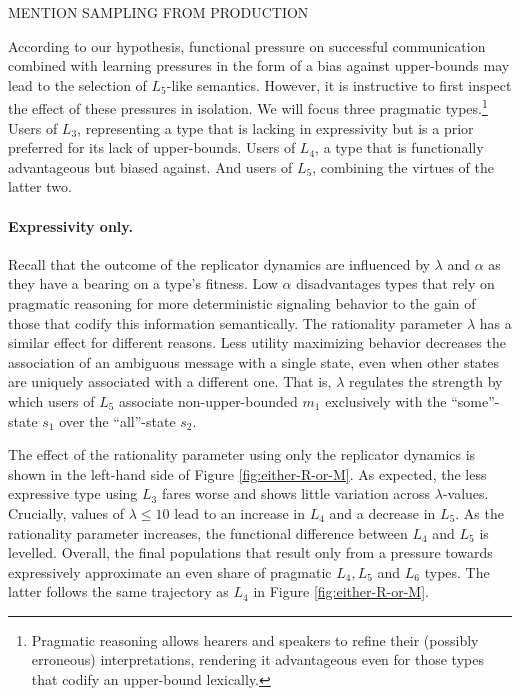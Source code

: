 \documentclass[a4paper]{article}
\newcommand{\hl}[1]{\textcolor[rgb]{.8,.33,.0}{#1}}%
\begin{document}
\hl{MENTION SAMPLING FROM PRODUCTION}

According to our hypothesis, functional pressure on successful communication combined with learning pressures in the form of a bias against upper-bounds may lead to the selection of $L_5$-like semantics. However, it is instructive to first inspect the effect of these pressures in isolation. We will focus three pragmatic types.\footnote{Pragmatic reasoning allows hearers and speakers to refine their (possibly erroneous) interpretations, rendering it advantageous even for those types that codify an upper-bound lexically.} Users of $L_3$, representing a type that is lacking in expressivity but is a prior preferred for its lack of upper-bounds. Users of $L_4$, a type that is functionally advantageous but biased against. And users of $L_5$, combining the virtues of the latter two.  

\paragraph{Expressivity only.} Recall that the outcome of the replicator dynamics are influenced by $\lambda$ and $\alpha$ as they have a bearing on a type's fitness. Low $\alpha$ disadvantages types that rely on pragmatic reasoning for more deterministic signaling behavior to the gain of those that codify this information semantically. The rationality parameter $\lambda$ has a similar effect for different reasons. Less utility maximizing behavior decreases the association of an ambiguous message with a single state, even when other states are uniquely associated with a different one. That is, $\lambda$ regulates the strength by which users of $L_5$ associate non-upper-bounded $m_1$ exclusively with the ``some''-state $s_1$ over the ``all''-state $s_2$. 

The effect of the rationality parameter using only the replicator dynamics is shown in the left-hand side of Figure \ref{fig:either-R-or-M}. As expected, the less expressive type using $L_3$ fares worse and shows little variation across $\lambda$-values. Crucially, values of $\lambda \leq 10$ lead to an increase in $L_4$ and a decrease in $L_5$. As the rationality parameter increases, the functional difference between $L_4$ and $L_5$ is levelled. Overall, the final populations that result only from a pressure towards expressively approximate an even share of pragmatic $L_4, L_5$ and $L_6$ types. The latter follows the same trajectory as $L_4$ in Figure \ref{fig:either-R-or-M}.  
\end{document}
